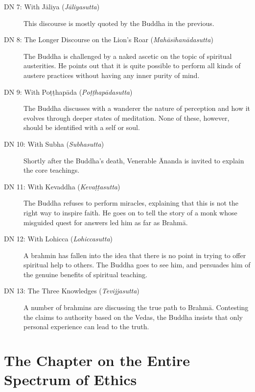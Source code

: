 \documentclass[12pt,openany]{book}%
\let\oldcontentsline\contentsline
\newcommand{\nopagecontentsline}[3]{\oldcontentsline{#1}{#2}{}}
\let\oldmainmatter\mainmatter
\renewcommand{\mainmatter}{%
\chapterfont{\setstretch{.85}\normalfont\centering}%
\sectionfont{\setstretch{.85}\normalfont\BalancedRagged}%
\oldmainmatter}
\begin{document}
\begin{description}
\item[DN 7: With \textsanskrit{Jāliya} (\textit{\textsanskrit{Jāliyasutta}})] This discourse is mostly quoted by the Buddha in the previous.%
\item[DN 8: The Longer Discourse on the Lion’s Roar (\textit{\textsanskrit{Mahāsīhanādasutta}})] The Buddha is challenged by a naked ascetic on the topic of spiritual austerities. He points out that it is quite possible to perform all kinds of austere practices without having any inner purity of mind.%
\item[DN 9: With \textsanskrit{Poṭṭhapāda} (\textit{\textsanskrit{Poṭṭhapādasutta}})] The Buddha discusses with a wanderer the nature of perception and how it evolves through deeper states of meditation. None of these, however, should be identified with a self or soul.%
\item[DN 10: With Subha (\textit{\textsanskrit{Subhasutta}})] Shortly after the Buddha’s death, Venerable Ānanda is invited to explain the core teachings.%
\item[DN 11: With Kevaddha (\textit{\textsanskrit{Kevaṭṭasutta}})] The Buddha refuses to perform miracles, explaining that this is not the right way to inspire faith. He goes on to tell the story of a monk whose misguided quest for answers led him as far as \textsanskrit{Brahmā}.%
\item[DN 12: With Lohicca (\textit{\textsanskrit{Lohiccasutta}})] A brahmin has fallen into the idea that there is no point in trying to offer spiritual help to others. The Buddha goes to see him, and persuades him of the genuine benefits of spiritual teaching.%
\item[DN 13: The Three Knowledges (\textit{\textsanskrit{Tevijjasutta}})] A number of brahmins are discussing the true path to \textsanskrit{Brahmā}. Contesting the claims to authority based on the Vedas, the Buddha insists that only personal experience can lead to the truth.%
\end{description}

%
\mainmatter%
\pagestyle{fancy}%
\part*{The Chapter on the Entire Spectrum of Ethics }
\markboth{}{}
\addtocontents{toc}{\let\protect\contentsline\protect\oldcontentsline}

%
\end{document}
